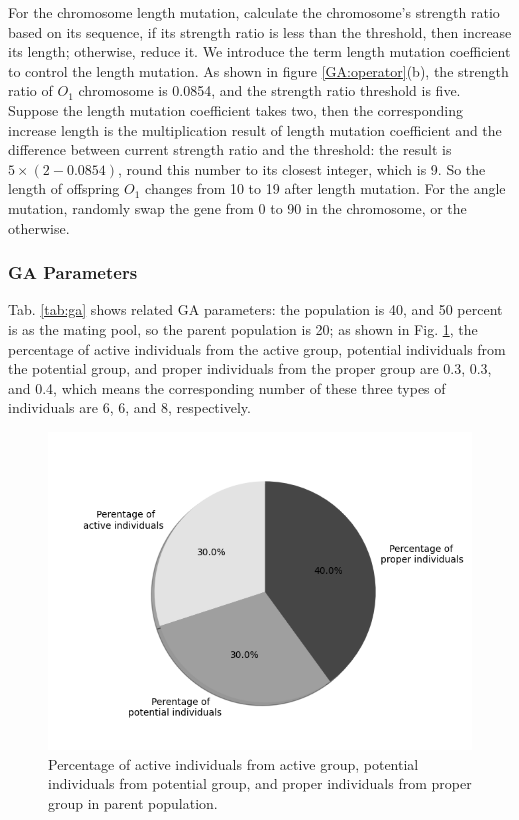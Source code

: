 For the chromosome length mutation, calculate the chromosome's strength ratio
based on its sequence, if its strength ratio is less than the threshold, then
increase its length; otherwise, reduce it. We introduce the term length
mutation coefficient to control the length mutation.  As shown in figure
\ref{GA:operator}(b), the strength ratio of $O_1$ chromosome is 0.0854, and the
strength ratio threshold is five. Suppose the length mutation coefficient takes
two, then the corresponding increase length is the multiplication result of
length mutation coefficient and the difference between current strength ratio
and the threshold: the result is $5\times(2-0.0854)$, round this number to its
closest integer, which is 9. So the length of offspring $O_1$ changes from 10
to 19 after length mutation.  For the angle mutation, randomly swap the gene
from 0 to 90 in the chromosome, or the otherwise.


\subsubsection{GA Parameters}
Tab. \ref{tab:ga} shows related GA parameters: the population is 40, and 50
percent is as the mating pool, so the parent population is 20; as
shown in Fig. \ref{fig:percentage}, the percentage of active individuals from
the active group, potential individuals from the potential group, and proper
individuals from the proper group are 0.3, 0.3, and 0.4, which means the
corresponding number of these three types of individuals are 6, 6, and 8,
respectively.

\begin{figure}[!tb]
	\centering
	\includegraphics[width=\linewidth]{Figures/chapter4/part1/fig/percentage_of_groups}
	\caption{Percentage of active individuals from active group, potential
	  individuals from potential group, and proper individuals from proper group
	 in parent population.}
	 \label{fig:percentage}
\end{figure}




